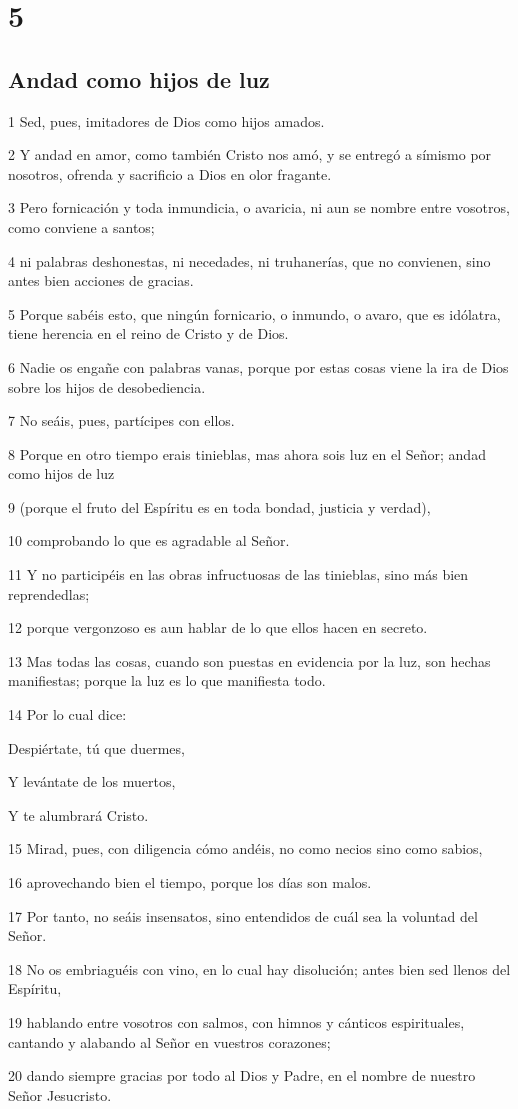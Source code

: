\chapter{5}

\section*{Andad como hijos de luz}

\par 1 Sed, pues, imitadores de Dios como hijos amados.
\par 2 Y andad en amor, como también Cristo nos amó, y se entregó a símismo por nosotros, ofrenda y sacrificio a Dios en olor fragante.
\par 3 Pero fornicación y toda inmundicia, o avaricia, ni aun se nombre entre vosotros, como conviene a santos;
\par 4 ni palabras deshonestas, ni necedades, ni truhanerías, que no convienen, sino antes bien acciones de gracias.
\par 5 Porque sabéis esto, que ningún fornicario, o inmundo, o avaro, que es idólatra, tiene herencia en el reino de Cristo y de Dios.
\par 6 Nadie os engañe con palabras vanas, porque por estas cosas viene la ira de Dios sobre los hijos de desobediencia.
\par 7 No seáis, pues, partícipes con ellos.
\par 8 Porque en otro tiempo erais tinieblas, mas ahora sois luz en el Señor; andad como hijos de luz
\par 9 (porque el fruto del Espíritu es en toda bondad, justicia y verdad),
\par 10 comprobando lo que es agradable al Señor.
\par 11 Y no participéis en las obras infructuosas de las tinieblas, sino más bien reprendedlas;
\par 12 porque vergonzoso es aun hablar de lo que ellos hacen en secreto.
\par 13 Mas todas las cosas, cuando son puestas en evidencia por la luz, son hechas manifiestas; porque la luz es lo que manifiesta todo.
\par 14 Por lo cual dice:
\par Despiértate, tú que duermes,
\par Y levántate de los muertos,
\par Y te alumbrará Cristo.
\par 15 Mirad, pues, con diligencia cómo andéis, no como necios sino como sabios,
\par 16 aprovechando bien el tiempo, porque los días son malos.
\par 17 Por tanto, no seáis insensatos, sino entendidos de cuál sea la voluntad del Señor.
\par 18 No os embriaguéis con vino, en lo cual hay disolución; antes bien sed llenos del Espíritu,
\par 19 hablando entre vosotros con salmos, con himnos y cánticos espirituales, cantando y alabando al Señor en vuestros corazones;
\par 20 dando siempre gracias por todo al Dios y Padre, en el nombre de nuestro Señor Jesucristo.

